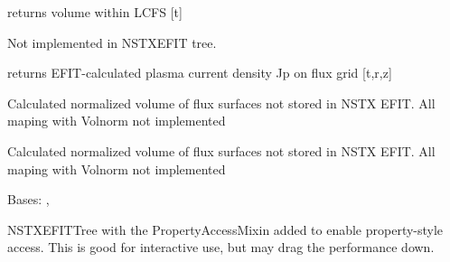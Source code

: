 \documentclass[letterpaper,10pt,english]{sphinxmanual}
\begin{document}
\begin{fulllineitems}
\begin{fulllineitems}
\label{eqtools:eqtools.NSTXEFIT.NSTXEFITTree.getVolLCFS}
returns volume within LCFS {[}t{]}

\end{fulllineitems}


\begin{fulllineitems}
\label{eqtools:eqtools.NSTXEFIT.NSTXEFITTree.getJp}
Not implemented in NSTXEFIT tree.

returns EFIT-calculated plasma current density Jp on flux grid {[}t,r,z{]}

\end{fulllineitems}


\begin{fulllineitems}
\label{eqtools:eqtools.NSTXEFIT.NSTXEFITTree.rz2volnorm}
Calculated normalized volume of flux surfaces not stored in NSTX EFIT. All maping with Volnorm
not implemented

\end{fulllineitems}


\begin{fulllineitems}
\label{eqtools:eqtools.NSTXEFIT.NSTXEFITTree.psinorm2volnorm}
Calculated normalized volume of flux surfaces not stored in NSTX EFIT. All maping with Volnorm
not implemented

\end{fulllineitems}


\end{fulllineitems}


\begin{fulllineitems}
\label{eqtools:eqtools.NSTXEFIT.NSTXEFITTreeProp}
Bases: {\hyperref[eqtools:eqtools.NSTXEFIT.NSTXEFITTree]{}}, {\hyperref[eqtools:eqtools.core.PropertyAccessMixin]{}}

NSTXEFITTree with the PropertyAccessMixin added to enable property-style
access. This is good for interactive use, but may drag the performance down.

\end{fulllineitems}
\end{document}

